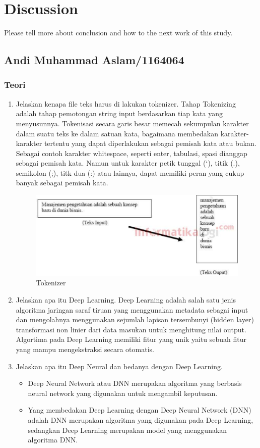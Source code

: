 \chapter{Discussion}
Please tell more about conclusion and how to the next work of this study.

\section{Andi Muhammad Aslam/1164064}
\subsection{Teori}
\begin{enumerate}
\item Jelaskan kenapa file teks harus di lakukan tokenizer.
\subitem Tahap Tokenizing adalah tahap pemotongan string input berdasarkan tiap kata yang menyusunnya. Tokenisasi secara garis besar memecah sekumpulan karakter dalam suatu teks ke dalam satuan kata, bagaimana membedakan karakter-karakter tertentu yang dapat diperlakukan sebagai pemisah kata atau bukan. Sebagai contoh karakter whitespace, seperti enter, tabulasi, spasi dianggap sebagai pemisah kata. Namun untuk karakter petik tunggal (‘), titik (.), semikolon (;), titk dua (:) atau lainnya, dapat memiliki peran yang cukup banyak sebagai pemisah kata.
\begin{figure}[!htbp]
	\centerline{\includegraphics[width=1\textwidth]{figures/andi/7-1.PNG}}
	\caption{Tokenizer}
	\label{c7_1}
\end{figure}

\item Jelaskan apa itu Deep Learning.
\subitem Deep Learning adalah salah satu jenis algoritma jaringan saraf tiruan yang menggunakan metadata sebagai input dan mengolahnya menggunakan sejumlah lapisan tersembunyi (hidden layer) transformasi non linier dari data masukan untuk menghitung nilai output. Algortima pada Deep Learning memiliki fitur yang unik yaitu sebuah fitur yang mampu mengekstraksi secara otomatis.
\item Jelaskan apa itu Deep Neural dan bedanya dengan Deep Learning.
\begin{itemize}
\item Deep Neural Network atau DNN merupakan algoritma yang berbasis neural network yang digunakan untuk mengambil keputusan.
\item Yang membedakan Deep Learning dengan  Deep Neural Network (DNN) adalah DNN merupakan algoritma yang digunakan pada Deep Learning, sedangkan Deep Learning merupakan model yang menggunakan algoritma DNN.
\end{itemize}
\end{enumerate}